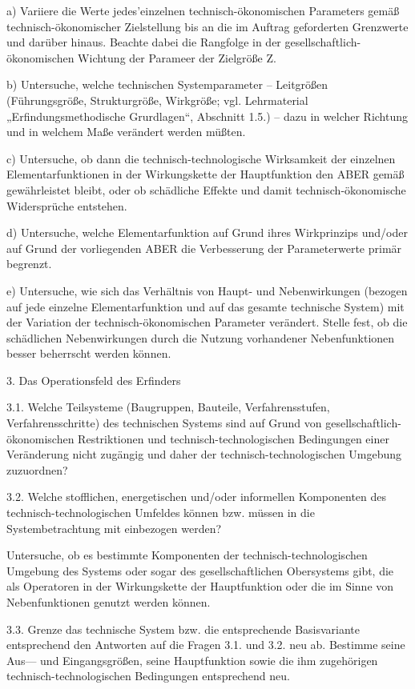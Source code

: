 \documentclass[11pt,a4paper]{article}
\begin{document}
a) Variiere die Werte jedes'einzelnen technisch-ökonomischen Parameters gemäß
technisch-ökonomischer Zielstellung bis an die im Auftrag geforderten
Grenzwerte und darüber hinaus. Beachte dabei die Rangfolge in der
gesellschaftlich-ökonomischen Wichtung der Parameer der Zielgröße Z.

b) Untersuche, welche technischen Systemparameter -- Leitgrößen
(Führungsgröße, Strukturgröße, Wirkgröße; vgl. Lehrmaterial
„Erfindungsmethodische Grurdlagen“, Abschnitt 1.5.) -- dazu in welcher
Richtung und in welchem Maße verändert werden müßten.

c) Untersuche, ob dann die technisch-technologische Wirksamkeit der einzelnen
Elementarfunktionen in der Wirkungskette der Hauptfunktion den ABER gemäß
gewährleistet bleibt, oder ob schädliche Effekte und damit
technisch-ökonomische Widersprüche entstehen.

d) Untersuche, welche Elementarfunktion auf Grund ihres Wirkprinzips und/oder
auf Grund der vorliegenden ABER die Verbesserung der Parameterwerte primär
begrenzt.

e) Untersuche, wie sich das Verhältnis von Haupt- und Nebenwirkungen (bezogen
auf jede einzelne Elementarfunktion und auf das gesamte technische System) mit
der Variation der technisch-ökonomischen Parameter verändert. Stelle fest, ob
die schädlichen Nebenwirkungen durch die Nutzung vorhandener Nebenfunktionen
besser beherrscht werden können.

3. Das Operationsfeld des Erfinders

3.1. Welche Teilsysteme (Baugruppen, Bauteile, Verfahrensstufen,
Verfahrensschritte) des technischen Systems sind auf Grund von
gesellschaftlich-ökonomischen Restriktionen und technisch-technologischen
Bedingungen einer Veränderung nicht zugängig und daher der
tech\-nisch-technologischen Umgebung zuzuordnen?

3.2. Welche stofflichen, energetischen und/oder informellen Komponenten des
technisch-tech\-nologischen Umfeldes können bzw. müssen in die
Systembetrachtung mit einbezogen werden?

Untersuche, ob es bestimmte Komponenten der technisch-technologischen Umgebung
des Systems oder sogar des gesellschaftlichen Obersystems gibt, die als
Operatoren in der Wirkungskette der Hauptfunktion oder die im Sinne von
Nebenfunktionen genutzt werden können.

3.3. Grenze das technische System bzw. die entsprechende Basisvariante
entsprechend den Antworten auf die Fragen 3.1. und 3.2. neu ab. Bestimme seine
Aus— und Eingangsgrößen, seine Hauptfunktion sowie die ihm zugehörigen
technisch-technologischen Bedingungen entsprechend neu.
\end{document}
